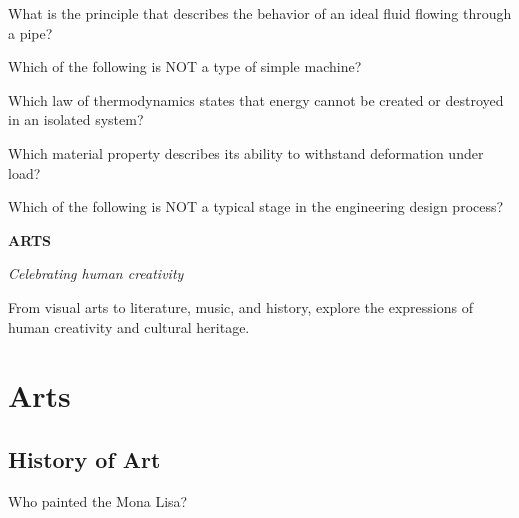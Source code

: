 \documentclass[12pt,a4paper]{book}
\renewcommand{\sectioncover}[3]{%
  \cleardoublepage
  \thispagestyle{empty}
  \begin{center}
    \vspace*{2cm}
    {\huge\bfseries\textcolor{questblue}{#1}\par}
    \vspace{0.7cm}
    {\Large\textit{#2}\par}
    \vspace{1.2cm}
    \begin{tcolorbox}[
      enhanced,
      colback=white,
      colframe=questorange,
      arc=5mm,
      boxrule=0.5mm,
      width=0.7\textwidth,
      halign=center,
      valign=center,
      height=5cm
    ]
      \begin{center}
        {\large #3\par}
      \end{center}
    \end{tcolorbox}
    \vspace{1.5cm}
  \end{center}
  \cleardoublepage
}
\begin{document}
\begin{enhancedmcq}{What is the principle that describes the behavior of an ideal fluid flowing through a pipe?}
\end{enhancedmcq}

\begin{enhancedmcq}{Which of the following is NOT a type of simple machine?}
\end{enhancedmcq}

\begin{enhancedmcq}[Thermodynamics]{Which law of thermodynamics states that energy cannot be created or destroyed in an isolated system?}
\end{enhancedmcq}

\begin{enhancedmcq}{Which material property describes its ability to withstand deformation under load?}
\end{enhancedmcq}

\begin{enhancedmcq}{Which of the following is NOT a typical stage in the engineering design process?}
\end{enhancedmcq}

\sectioncover{ARTS}{Celebrating human creativity}{From visual arts to literature, music, and history, explore the expressions of human creativity and cultural heritage.}

\chapter{Arts}
\section{History of Art}

\begin{enhancedmcq}{Who painted the Mona Lisa?}
\end{enhancedmcq}
\end{document}
